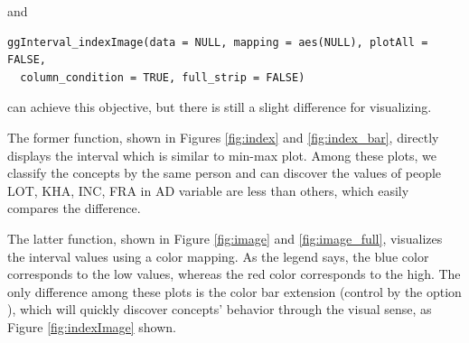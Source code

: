\documentclass[article]{jss}
\begin{document}
and 

\begin{verbatim}
ggInterval_indexImage(data = NULL, mapping = aes(NULL), plotAll = FALSE,
  column_condition = TRUE, full_strip = FALSE)
\end{verbatim}

can achieve this objective, but there is still a slight difference for visualizing. 

The former function, shown in Figures \ref{fig:index} and \ref{fig:index_bar}, directly displays the interval which is similar to min-max plot. Among these plots, we classify the concepts by the same person and can discover the values of people LOT, KHA, INC, FRA in AD variable are less than others, which easily compares the difference. 

The latter function, shown in Figure \ref{fig:image} and \ref{fig:image_full}, visualizes the interval values using a color mapping. As the legend says, the blue color corresponds to the low values, whereas the red color corresponds to the high. The only difference among these plots is the color bar extension (control by the option ), which will quickly discover concepts' behavior through the visual sense, as Figure \ref{fig:indexImage} shown.
\end{document}

